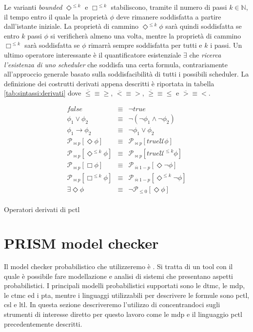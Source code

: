 Le varianti \emph{bounded} $\Diamond^{\leq k}$ e $\Box^{\leq k}$ stabiliscono, tramite il numero di passi $k \in \mathbb{N}$, il tempo entro il quale la proprietà $\phi$ deve rimanere soddisfatta a partire dall'istante iniziale. La proprietà di cammino $\Diamond^{\leq k}\phi$ sarà quindi soddisfatta se entro $k$ passi $\phi$ si verificherà almeno una volta, mentre la proprietà di cammino $\Box^{\leq k}$ sarà soddisfatta se $\phi$ rimarrà sempre soddisfatta per tutti e $k$ i passi. 
Un ultimo operatore interessante è il quantificatore esistenziale $\exists$ che \emph{ricerca l'esistenza di uno scheduler} che soddisfa una certa formula, contrariamente all'approccio generale basato sulla soddisfacibilità di tutti i possibili scheduler.
La definizione dei costrutti derivati appena descritti è riportata in tabella \ref{tab:sintassi:derivati} dove $\overline\leq \equiv \geq$, $\overline < \equiv >$, $\overline\geq \equiv \leq$ e $\overline > \equiv <$.
\begin{table}[htbp!]
$$
\begin{array}{rcl}
	false & \equiv & \neg true \\
	\phi_1 \vee \phi_2 & \equiv & \neg(\neg\phi_1 \wedge \neg\phi_2) \\
	\phi_1 \rightarrow \phi_2 & \equiv & \neg\phi_1 \vee \phi_2 \\
	\mathcal{P}_{\bowtie p}[\Diamond \phi] & \equiv & \mathcal{P}_{\bowtie p}[true \mathcal{U} \phi] \\
	\mathcal{P}_{\bowtie p}[\Diamond^{\leq k} \phi] & \equiv & \mathcal{P}_{\bowtie p}[true \mathcal{U}^{\leq k} \phi] \\
	\mathcal{P}_{\bowtie p}[\Box \phi] & \equiv & \mathcal{P}_{\overline\bowtie 1-p}[\Diamond \neg \phi] \\
	\mathcal{P}_{\bowtie p}[\Box^{\leq k} \phi] & \equiv & \mathcal{P}_{\overline\bowtie 1-p}[\Diamond^{\leq k} \neg \phi] \\
	\exists\Diamond\phi & \equiv & \neg \mathcal{P}_{\leq 0}[\Diamond\phi] \\
\end{array}
$$
\caption{Operatori derivati di \ac{pctl}}
\label{tab:sintassi:derivati}
\end{table}

\section{PRISM model checker}
Il model checker probabilistico che utilizzeremo è \prism{} \cite{KNP11}. Si tratta di un tool con il quale è possibile fare modellazione e analisi di sistemi che presentano aspetti probabilistici. I principali modelli probabilistici supportati sono le \ac{dtmc}, le \ac{mdp}, le \ac{ctmc} ed i \ac{pta}, mentre i linguaggi utilizzabili per descrivere le formule sono \ac{pctl}, \ac{csl} e \ac{ltl}. In questa sezione descriveremo l'utilizzo di \prism{} concentrandoci sugli strumenti di interesse diretto per questo lavoro come le \ac{mdp} e il linguaggio \ac{pctl} precedentemente descritti.

